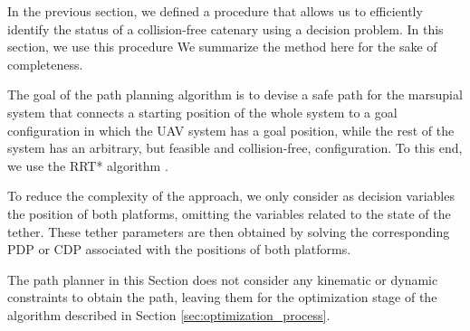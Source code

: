 
In the previous section, we defined a procedure that allows us to efficiently identify the status of a collision-free catenary using a decision problem. In this section, we use this procedure  We summarize the method here for the sake of completeness.


The goal of the path planning algorithm is to devise a safe path for the marsupial system that connects a starting position of the whole system to a goal configuration in which the UAV system has a goal position, while the rest of the system has an arbitrary, but feasible and collision-free, configuration. To this end, we use the RRT* algorithm \cite{karaman_rrt_star}.

To reduce the complexity of the approach, we only consider as decision variables the position of both platforms, omitting the variables related to the state of the tether. %
These tether parameters are then obtained by solving the corresponding PDP or CDP associated with the positions of both platforms.

The path planner in this Section does not consider any kinematic or dynamic constraints to obtain the path, leaving them for the optimization stage of the algorithm described in Section \ref{sec:optimization_process}.



